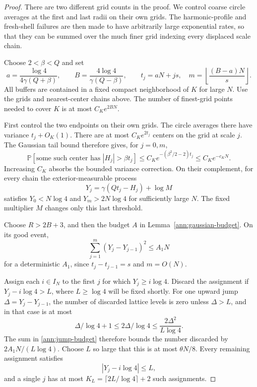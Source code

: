 \documentclass[11pt]{article}
\numberwithin{equation}{section}
\theoremstyle{definition}
\theoremstyle{remark}
\newcommand{\PP}{\mathbb P}
\newcommand{\1}{\mathbf 1}
\begin{document}
\begin{proof}
There are two different grid counts in the proof. We control coarse
circle averages at the first and last radii on their own grids.
The harmonic-profile and fresh-shell failures are then made to have
arbitrarily large exponential rates, so that they can be summed over
the much finer grid indexing every displaced scale chain.

Choose \(2<\beta<Q\) and set
\[
 a=\frac{\log4}{4\gamma(Q+\beta)},\qquad
 B=\frac{4\log4}{\gamma(Q-\beta)},\qquad
 t_j=aN+js,\quad
 m=\left\lfloor\frac{(B-a)N}{s}\right\rfloor .
\]
All buffers are contained in a fixed compact neighborhood of \(K\)
for large \(N\).  Use the grids and nearest-center chains above.
The number of finest-grid points needed to cover \(K\) is at most
\(C_Ke^{2BN}\).

First control the two endpoints on their own grids.
The circle averages there have variance \(t_j+O_K(1)\).
There are at most \(C_Ke^{2t_j}\) centers on the grid at scale
\(j\).  The Gaussian tail bound therefore gives, for \(j=0,m\),
\begin{equation}
 \PP[\text{some such center has }|H_j|>\beta t_j]
 \le C_K e^{-(\beta^2/2-2)t_j}
 \le C_K e^{-c_KN}.
 \label{ann:endpoint-tail}
\end{equation}
Increasing \(C_K\) absorbs the bounded variance correction.
On their complement, for every chain the exterior-measurable
process
\[
 Y_j=\gamma(Qt_j-H_j)+\log M
\]
satisfies \(Y_0<N\log4\) and \(Y_m>2N\log4\) for sufficiently
large \(N\).  The fixed multiplier \(M\) changes only this last
threshold.

Choose \(R>2B+3\), and then the budget \(A\) in
Lemma~\ref{ann:gaussian-budget}.  On its good event,
\begin{equation}
 \sum_{j=1}^m(Y_j-Y_{j-1})^2\le A_1N
 \label{ann:jump-budget}
\end{equation}
for a deterministic \(A_1\), since \(t_j-t_{j-1}=s\)
and \(m=O(N)\).

Assign each \(i\in I_N\) to the first \(j\) for which
\(Y_j\ge i\log4\).  Discard the assignment if
\(Y_j-i\log4>L\), where \(L\ge\log4\) will be fixed shortly.
For one upward jump \(\Delta=Y_j-Y_{j-1}\), the number of
discarded lattice levels is zero unless \(\Delta>L\), and in
that case is at most
\[
 \Delta/\log4+1\le 2\Delta/\log4
                 \le\frac{2\Delta^2}{L\log4}.
\]
The sum in \eqref{ann:jump-budget} therefore bounds the number
discarded by \(2A_1N/(L\log4)\).  Choose \(L\) so large
that this is at most \(\theta N/8\).
Every remaining assignment satisfies
\begin{equation}
 |Y_j-i\log4|\le L,
 \label{ann:alignment}
\end{equation}
and a single \(j\) has at most
\(K_L=\lceil2L/\log4\rceil+2\) such assignments.


\end{proof}
\end{document}
